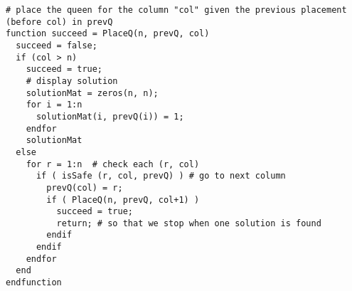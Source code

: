\documentclass[12pt,a4paper,hidelinks,fleqn]{article}            %
\begin{document}
\begin{verbatim}
# place the queen for the column "col" given the previous placement (before col) in prevQ                                                    
function succeed = PlaceQ(n, prevQ, col)                                                                                                     
  succeed = false;                                                                                                                           
  if (col > n)                                                                                                                               
    succeed = true;                                                                                                                          
    # display solution                                                                                                                       
    solutionMat = zeros(n, n);                                                                                                               
    for i = 1:n                                                                                                                              
      solutionMat(i, prevQ(i)) = 1;                                                                                                          
    endfor                                                                                                                                   
    solutionMat                                                                                                                              
  else                                                                                                                                       
    for r = 1:n  # check each (r, col)                                                                                                       
      if ( isSafe (r, col, prevQ) ) # go to next column                                                                                      
        prevQ(col) = r;                                                                                                                      
        if ( PlaceQ(n, prevQ, col+1) )  
          succeed = true;
          return; # so that we stop when one solution is found                                                                               
        endif                                                                                                                                
      endif                                                                                                                                  
    endfor                                                                                                                                   
  end                                                                                                                                        
endfunction           
\end{verbatim}
\end{document}
